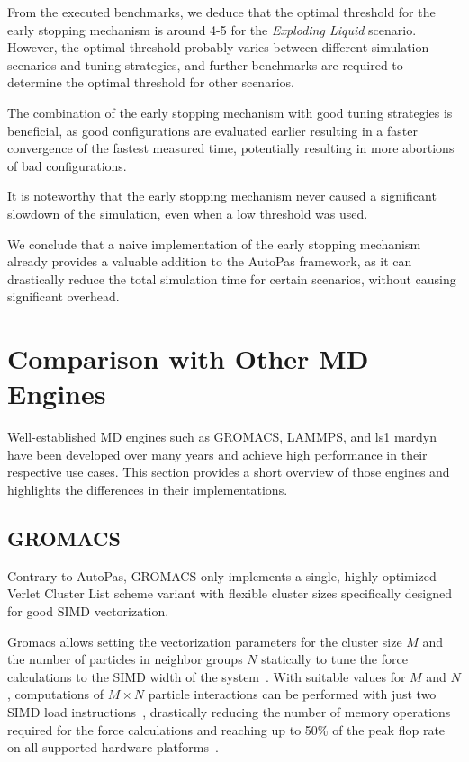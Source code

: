 \documentclass[conference]{IEEEtran}
\begin{document}
From the executed benchmarks, we deduce that the optimal threshold for the early stopping mechanism is around 4-5 for the \textit{Exploding Liquid} scenario. However, the optimal threshold probably varies between different simulation scenarios and tuning strategies, and further benchmarks are required to determine the optimal threshold for other scenarios.

The combination of the early stopping mechanism with good tuning strategies is beneficial, as good configurations are evaluated earlier resulting in a faster convergence of the fastest measured time, potentially resulting in more abortions of bad configurations.

It is noteworthy that the early stopping mechanism never caused a significant slowdown of the simulation, even when a low threshold was used.

We conclude that a naive implementation of the early stopping mechanism already provides a valuable addition to the AutoPas framework, as it can drastically reduce the total simulation time for certain scenarios, without causing significant overhead.


\section{Comparison with Other MD Engines}

Well-established MD engines such as GROMACS, LAMMPS, and ls1 mardyn have been developed over many years and achieve high performance in their respective use cases. This section provides a short overview of those engines and highlights the differences in their implementations.

\subsection{GROMACS}

Contrary to AutoPas, GROMACS only implements a single, highly optimized Verlet Cluster List scheme variant with flexible cluster sizes specifically designed for good SIMD vectorization.

Gromacs allows setting the vectorization parameters for the cluster size $M$ and the number of particles in neighbor groups $N$ statically to tune the force calculations to the SIMD width of the system~\cite{PALL20132641}. With suitable values for $M$ and $N$, computations of $M \times N$ particle interactions can be performed with just two SIMD load instructions~\cite{Solving_Software_Challenges_Exascale_2014}, drastically reducing the number of memory operations required for the force calculations and reaching up to 50\% of the peak flop rate on all supported hardware platforms~\cite{Solving_Software_Challenges_Exascale_2014}.
\end{document}
